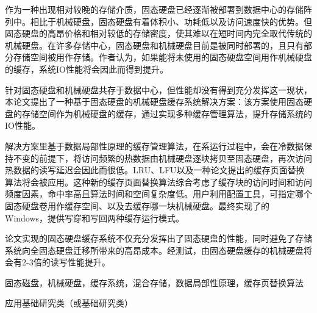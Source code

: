 
\begin{cabstract}

作为一种出现相对较晚的存储介质，固态硬盘已经逐渐被部署到数据中心的存储阵列中。相比于机械硬盘，固态硬盘有着体积小、功耗低以及访问速度快的优势。但固态硬盘的高昂价格和相对较低的存储密度，使其难以在短时间内完全取代传统的机械硬盘。在许多存储中心，固态硬盘和机械硬盘目前是被同时部署的，且只有部分存储空间被用作存储。作者认为，如果能将未使用的固态硬盘空间用作机械硬盘的缓存，系统IO性能将会因此而得到提升。

针对固态硬盘和机械硬盘共存于数据中心，但性能却没有得到充分发挥这一现状，本论文提出了一种基于固态硬盘的机械硬盘缓存系统解决方案：该方案使用固态硬盘的存储空间作为机械硬盘的缓存，通过实现多种缓存管理算法，提升存储系统的IO性能。

解决方案里基于数据局部性原理的缓存管理算法，在系运行过程中，会在冷数据保持不变的前提下，将访问频繁的热数据由机械硬盘逐块拷贝至固态硬盘，再次访问热数据的读写延迟会因此而很低。LRU、LFU以及一种论文提出的缓存页面替换算法将会被应用。这种新的缓存页面替换算法综合考虑了缓存块的访问时间和访问频度因素，命中率高且算法时间和空间复杂度低。用户利用配置工具，可指定哪个固态硬盘卷用作缓存空间、以及去缓存哪一块机械硬盘。最终实现了的Windows，提供写穿和写回两种缓存运行模式。

论文实现的固态硬盘缓存系统不仅充分发挥出了固态硬盘的性能，同时避免了存储系统向全固态硬盘迁移所带来的高昂成本。经测试，由固态硬盘缓存的机械硬盘将会有2-3倍的读写性能提升。

\end{cabstract}

\begin{ckeywords}
固态磁盘，机械硬盘，缓存系统，混合存储，数据局部性原理，缓存页替换算法
\end{ckeywords}

\begin{cthesistype}
应用基础研究类（或基础研究类）
\end{cthesistype}


